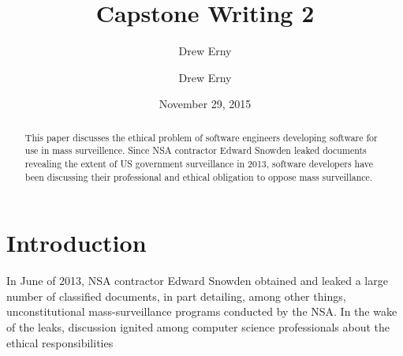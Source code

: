 \documentclass{sig-alternate-05-2015}
\begin{document}
\title{Capstone Writing 2}
\author{Drew Erny}
\date{November 29, 2015}


\author{
  \alignauthor
  Drew Erny
}

\maketitle
\begin{abstract}
This paper discusses the ethical problem of software engineers developing
software for use in mass surveillence. Since NSA contractor Edward Snowden
leaked documents revealing the extent of US government surveillance in 2013,
software developers have been discussing their professional and ethical
obligation to oppose mass surveillance.
\end{abstract}

\section{Introduction}
In June of 2013, NSA contractor Edward Snowden obtained and leaked a large
number of classified documents, in part detailing, among other things,
unconstitutional mass-surveillance programs conducted by the NSA. In the wake
of the leaks, discussion ignited among computer science professionals about the
ethical responsibilities 
\end{document}
